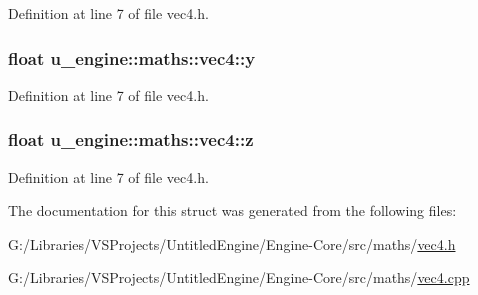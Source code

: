Definition at line 7 of file vec4.\+h.

\hypertarget{structu__engine_1_1maths_1_1vec4_a6a927f4b26273d6edafc9dd1ae2ee6ff}{}
\subsubsection[{y}]{\setlength{\rightskip}{0pt plus 5cm}float u\+\_\+engine\+::maths\+::vec4\+::y}\label{structu__engine_1_1maths_1_1vec4_a6a927f4b26273d6edafc9dd1ae2ee6ff}


Definition at line 7 of file vec4.\+h.

\hypertarget{structu__engine_1_1maths_1_1vec4_aa4ee395d64d387a30ec6e46a6413c3a1}{}
\subsubsection[{z}]{\setlength{\rightskip}{0pt plus 5cm}float u\+\_\+engine\+::maths\+::vec4\+::z}\label{structu__engine_1_1maths_1_1vec4_aa4ee395d64d387a30ec6e46a6413c3a1}


Definition at line 7 of file vec4.\+h.



The documentation for this struct was generated from the following files\+:\begin{DoxyCompactItemize}
\item 
G\+:/\+Libraries/\+V\+S\+Projects/\+Untitled\+Engine/\+Engine-\/\+Core/src/maths/\hyperlink{vec4_8h}{vec4.\+h}\item 
G\+:/\+Libraries/\+V\+S\+Projects/\+Untitled\+Engine/\+Engine-\/\+Core/src/maths/\hyperlink{vec4_8cpp}{vec4.\+cpp}\end{DoxyCompactItemize}
